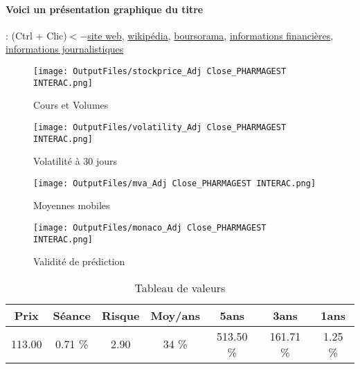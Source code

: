 \documentclass[11pt,a4paper]{report}%
\begin{document}
\paragraph{Voici un présentation graphique du titre} : (Ctrl + Clic)$<-$\href{https://pharmagest.com/}{site web}, \href{https://fr.wikipedia.org/wiki/Pharmagest_Interactive}{wikipédia}, \href{https://www.boursorama.com/cours/1rPPHA}{boursorama}, \href{https://www.qwant.com/?q=site:https:%2f%2fwww.easybourse.com%2faction-societe%2fPHARMAGEST-INTERAC&t=web&client=ext-firefox-hp}{informations financières}, \href{https://bourse.lerevenu.com/cours-de-bourse/fiche-valeur-synthese/PHARMAGEST-INTERAC/PHA-FR}{informations journalistiques}
\begin{figure}[!htb]
   \begin{minipage}{0.5\textwidth}
     \centering
     \texttt{[image: OutputFiles/stockprice\_Adj Close\_PHARMAGEST INTERAC.png]}
     \caption{Cours et Volumes}\label{Fig:price_PHARMAGEST INTERAC}
   \end{minipage}\hfill
   \begin{minipage}{0.5\textwidth}
     \centering
     \texttt{[image: OutputFiles/volatility\_Adj Close\_PHARMAGEST INTERAC.png]}
     \caption{Volatilité à 30 jours}\label{Fig:volat_PHARMAGEST INTERAC}
   \end{minipage}
\end{figure}
\begin{figure}[!htb]
   \begin{minipage}{0.5\textwidth}
     \centering
     \texttt{[image: OutputFiles/mva\_Adj Close\_PHARMAGEST INTERAC.png]}
     \caption{Moyennes mobiles}\label{Fig:mva_PHARMAGEST INTERAC}
   \end{minipage}\hfill
   \begin{minipage}{0.5\textwidth}
     \centering
     \texttt{[image: OutputFiles/monaco\_Adj Close\_PHARMAGEST INTERAC.png]}
     \caption{Validité de prédiction}\label{Fig:prediction_PHARMAGEST INTERAC}
   \end{minipage}
\end{figure}

\begin{table}[H]
  \centering
    \begin{tabular}{|c|c|c|c|c|c|c|}
    \hline
    Prix & Séance & Risque  & Moy/ans & 5ans & 3ans & 1ans \\
    \hline
    113.00 &    0.71 \%    & 2.90 & 34 \% & 513.50 \% & 161.71 \% & 1.25 \% \\
    \hline
    \end{tabular}%
        \label{tab:table_PHARMAGEST INTERAC}%
      \caption{Tableau de valeurs}
\end{table}%
\end{document}

